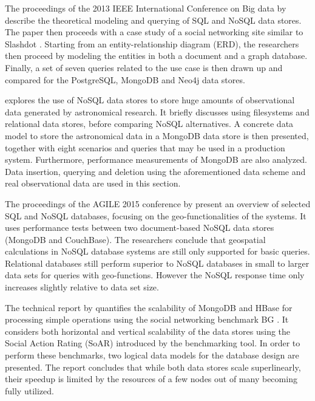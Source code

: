 The proceedings of the 2013 IEEE International Conference on Big data by \textcite{Kaur2013} describe the theoretical modeling and querying of SQL and NoSQL data stores. The paper then proceeds with a case study of a social networking site similar to Slashdot \autocite{Malda1997}. Starting from an entity-relationship diagram (ERD), the researchers then proceed by modeling the entities in both a document and a graph database. Finally, a set of seven queries related to the use case is then drawn up and compared for the PostgreSQL, MongoDB and Neo4j data stores.

\textcite{Zhao2015} explores the use of NoSQL data stores to store huge amounts of observational data generated by astronomical research. It briefly discusses using filesystems and relational data stores, before comparing NoSQL alternatives. A concrete data model to store the astronomical data in a MongoDB data store is then presented, together with eight scenarios and queries that may be used in a production system.
Furthermore, performance measurements of MongoDB are also analyzed. Data insertion, querying and deletion using the aforementioned data scheme and real observational data are used in this section.

The proceedings of the AGILE 2015 conference by \textcite{Schmid2015} present an overview of selected SQL and NoSQL databases, focusing on the geo-functionalities of the systems. It uses performance tests between two document-based NoSQL data stores (MongoDB and CouchBase). The researchers conclude that geospatial calculations in NoSQL database systems are still only supported for basic queries. Relational databases still perform superior to NoSQL databases in small to larger data sets for queries with geo-functions. However the NoSQL response time only increases slightly relative to data set size.

The technical report by \textcite{Barahmand2015} quantifies the scalability of MongoDB and HBase for processing simple operations using the social networking benchmark BG \autocite{Barahmand2013}. It considers both horizontal and vertical scalability of the data stores using the Social Action Rating (SoAR) introduced by the benchmarking tool.
In order to perform these benchmarks, two logical data models for the database design are presented. The report concludes that while both data stores scale superlinearly, their speedup is limited by the resources of a few nodes out of many becoming fully utilized.

